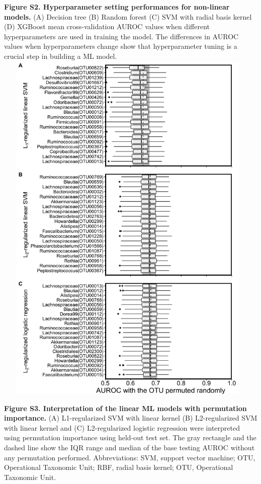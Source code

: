 \documentclass[11pt,]{article}
\begin{document}
\textbf{Figure S2. Hyperparameter setting performances for non-linear
models.} (A) Decision tree (B) Random forest (C) SVM with radial basis
kernel (D) XGBoost mean cross-validation AUROC values when different
hyperparameters are used in training the model. The differences in AUROC
values when hyperparameters change show that hyperparameter tuning is a
crucial step in building a ML model. \newpage
\includegraphics[height=17.5cm, width=13cm]{Figure_S3.png}

\textbf{Figure S3. Interpretation of the linear ML models with
permutation importance.} (A) L1-regularized SVM with linear kernel (B)
L2-regularized SVM with linear kernel and (C) L2-regularized logistic
regression were interpreted using permutation importance using held-out
test set. The gray rectangle and the dashed line show the IQR range and
median of the base testing AUROC without any permutation performed.
Abbreviations: SVM, support vector machine; OTU, Operational Taxonomic
Unit; RBF, radial basis kernel; OTU, Operational Taxonomic Unit.
\end{document}
